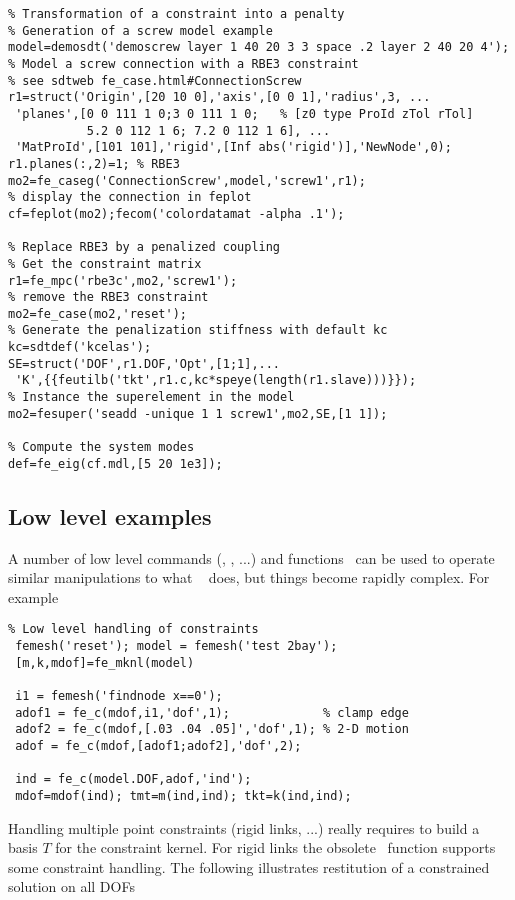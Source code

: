 \begin{verbatim}
% Transformation of a constraint into a penalty
% Generation of a screw model example
model=demosdt('demoscrew layer 1 40 20 3 3 space .2 layer 2 40 20 4');
% Model a screw connection with a RBE3 constraint
% see sdtweb fe_case.html#ConnectionScrew
r1=struct('Origin',[20 10 0],'axis',[0 0 1],'radius',3, ...
 'planes',[0 0 111 1 0;3 0 111 1 0;   % [z0 type ProId zTol rTol]
           5.2 0 112 1 6; 7.2 0 112 1 6], ...
 'MatProId',[101 101],'rigid',[Inf abs('rigid')],'NewNode',0);
r1.planes(:,2)=1; % RBE3
mo2=fe_caseg('ConnectionScrew',model,'screw1',r1);
% display the connection in feplot
cf=feplot(mo2);fecom('colordatamat -alpha .1');

% Replace RBE3 by a penalized coupling
% Get the constraint matrix
r1=fe_mpc('rbe3c',mo2,'screw1');
% remove the RBE3 constraint
mo2=fe_case(mo2,'reset');
% Generate the penalization stiffness with default kc
kc=sdtdef('kcelas');
SE=struct('DOF',r1.DOF,'Opt',[1;1],...
 'K',{{feutilb('tkt',r1.c,kc*speye(length(r1.slave)))}});
% Instance the superelement in the model
mo2=fesuper('seadd -unique 1 1 screw1',mo2,SE,[1 1]);

% Compute the system modes
def=fe_eig(cf.mdl,[5 20 1e3]);
\end{verbatim}%


\subsection{Low level examples} %


A number of low level commands (, , ...) and functions \fec\ can be used to operate similar manipulations to what \fecase\  does, but things become rapidly complex. For example

\begin{verbatim}
% Low level handling of constraints
 femesh('reset'); model = femesh('test 2bay');
 [m,k,mdof]=fe_mknl(model)

 i1 = femesh('findnode x==0');
 adof1 = fe_c(mdof,i1,'dof',1);             % clamp edge
 adof2 = fe_c(mdof,[.03 .04 .05]','dof',1); % 2-D motion
 adof = fe_c(mdof,[adof1;adof2],'dof',2); 

 ind = fe_c(model.DOF,adof,'ind');
 mdof=mdof(ind); tmt=m(ind,ind); tkt=k(ind,ind);
\end{verbatim}

Handling multiple point constraints (rigid links, ...) really requires to build a basis $T$ for the constraint kernel. For rigid links the obsolete \rigid\ function supports some constraint handling. The following illustrates restitution of a constrained solution on all DOFs

